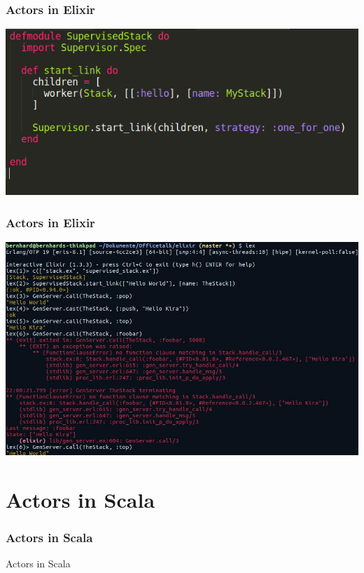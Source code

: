 \documentclass{beamer}
\begin{document}

\begin{frame}
\frametitle{Actors in Elixir}
\includegraphics[width=1\linewidth]{./images/elixir_stack_supervisor.png}
\end{frame}


\begin{frame}
\frametitle{Actors in Elixir}
\includegraphics[width=0.95\linewidth]{./images/elixir_stack_supervisor_terminal.jpg}
\end{frame}


\section{Actors in Scala}

\begin{frame}
\frametitle{Actors in Scala}
\Huge{\centerline{Actors in Scala}}
\end{frame}


\end{document}
